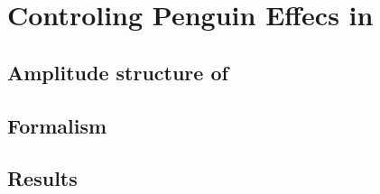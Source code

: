 
\chapter{Controling Penguin Effecs in \phis}
\label{Penguins}

\section{Amplitude structure of \BsJpsiPhi}
\label{jpsiphi_amp_struct}


\section{Formalism}
\label{penguin_formalism}


\section{Results}
\label{penguin_results}

